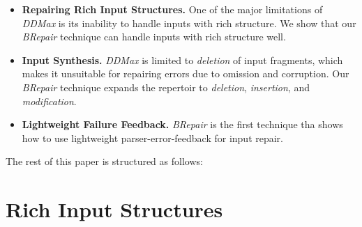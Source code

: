 \documentclass[sigconf,review,anonymous]{acmart}
\newcounter{todocounter}
\newcommand{\todo}[1]{\marginpar{$|$}\textcolor{red}{\stepcounter{todocounter}\footnote[\thetodocounter]{\textcolor{red}{\textbf{TODO }}\textit{#1}}}}
\renewcommand{\todo}[1]{}
\newcommand{\ddmax}{\textit{DDMax}\xspace}
\newcommand{\brepair}{\textit{BRepair}\xspace}
\begin{document}
\begin{itemize}
\item \textbf{Repairing Rich Input Structures.} One of the major limitations of
\ddmax is its inability to handle inputs with rich structure. We show that our
\brepair technique can handle inputs with rich structure well.
\item \textbf{Input Synthesis.} \ddmax is limited to \emph{deletion} of input
fragments, which makes it unsuitable for repairing errors due to omission and
corruption. Our \brepair technique expands the repertoir to \emph{deletion},
\emph{insertion}, and \emph{modification}.
\item \textbf{Lightweight Failure Feedback.} \brepair is the first technique
tha shows how to use lightweight parser-error-feedback for input repair.
\end{itemize}

The rest of this paper is structured as follows: \todo{describe sections/order}

\section{Rich Input Structures} %
\label{sec:rich-input-structures}
\todo{we should provide an anonymous notebook that allows to test the examples (in Table 1), it will be interesting}

\todo{discuss first (two) examples}
\end{document}
